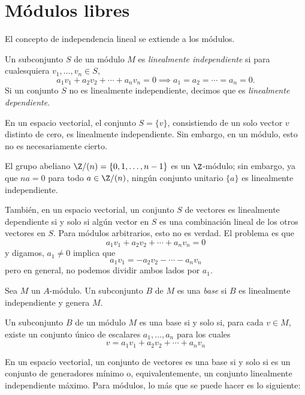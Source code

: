 \section{Módulos libres}

El concepto de independencia lineal se extiende a los módulos.

\begin{definition}
  Un subconjunto $S$ de un módulo $M$ es \emph{linealmente independiente} si para cualesquiera $v_1,\ldots,v_n \in S$,
    \[
      a_1 v_1 + a_2 v_2 + \cdots + a_n v_n = 0 \implies a_1 = a_2 = \cdots = a_n = 0.
    \]
  Si un conjunto $S$ no es linealmente independiente, decimos que es \emph{linealmente dependiente}.
\end{definition}

En un espacio vectorial, el conjunto $S = \{v\}$, consistiendo de un solo vector $v$ distinto de cero, es linealmente independiente. Sin embargo, en un módulo, esto no es necesariamente cierto.

\begin{example}
  El grupo abeliano $\Z/(n) = \{0,1,\ldots,n-1\}$ es un $\Z$-módulo; sin embargo, ya que $na = 0$ para todo $a \in \Z/(n)$, ningún conjunto unitario $\{a\}$ es linealmente independiente.
\end{example}

También, en un espacio vectorial, un conjunto $S$ de vectores es linealmente dependiente si y solo si algún vector en $S$ es una combinación lineal de los otros vectores en $S$. Para módulos arbitrarios, esto no es verdad. El problema es que
\[
  a_1v_1 + a_2v_2 + \cdots + a_nv_n = 0
\]
y digamos, $a_1 \neq 0$ implica que 
\[
  a_1v_1 = -a_2v_2 - \cdots - a_nv_n
\]
pero en general, no podemos dividir ambos lados por $a_1$.

\begin{definition}
  Sea $M$ un $A$-módulo. Un subconjunto $B$ de $M$ es una \emph{base} si $B$ es linealmente independiente y genera $M$.
\end{definition}

\begin{theorem}
  Un subconjunto $B$ de un módulo $M$ es una base si y solo si, para cada $v \in M$, existe un conjunto único de escalares $a_1,\ldots,a_n$ para los cuales
  \[
    v = a_1v_1 + a_2v_2 + \cdots + a_nv_n \tag*{\qed}
  \]
\end{theorem}

En un espacio vectorial, un conjunto de vectores es una base si y solo si es un conjunto de generadores mínimo o, equivalentemente, un conjunto linealmente independiente máximo. Para módulos, lo más que se puede hacer es lo siguiente:

